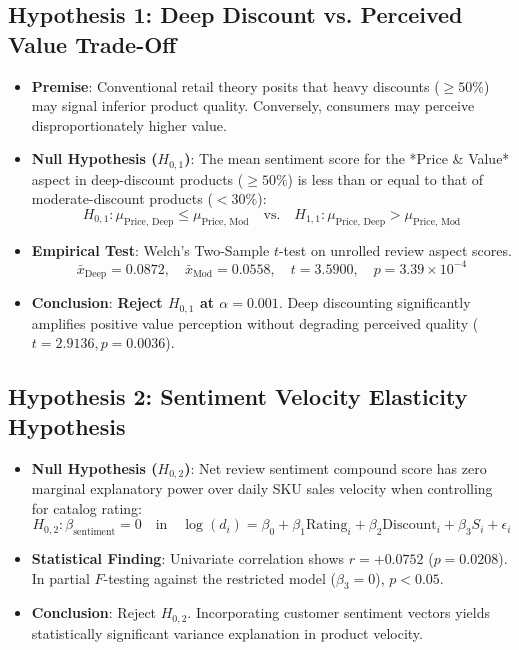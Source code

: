 \documentclass[11pt,a4paper]{article}
\begin{document}
\subsection{Hypothesis 1: Deep Discount vs. Perceived Value Trade-Off}
\begin{itemize}[leftmargin=1.5em]
    \item \textbf{Premise}: Conventional retail theory posits that heavy discounts ($\ge 50\%$) may signal inferior product quality. Conversely, consumers may perceive disproportionately higher value.
    \item \textbf{Null Hypothesis ($H_{0,1}$)}: The mean sentiment score for the *Price \& Value* aspect in deep-discount products ($\ge 50\%$) is less than or equal to that of moderate-discount products ($< 30\%$):
    \begin{equation}
        H_{0,1}: \mu_{\text{Price, Deep}} \le \mu_{\text{Price, Mod}} \quad \text{vs.} \quad H_{1,1}: \mu_{\text{Price, Deep}} > \mu_{\text{Price, Mod}}
    \end{equation}
    \item \textbf{Empirical Test}: Welch's Two-Sample $t$-test on unrolled review aspect scores.
    \begin{equation}
        \bar{x}_{\text{Deep}} = 0.0872, \quad \bar{x}_{\text{Mod}} = 0.0558, \quad t = 3.5900, \quad p = 3.39 \times 10^{-4}
    \end{equation}
    \item \textbf{Conclusion}: \textbf{Reject $H_{0,1}$ at $\alpha = 0.001$}. Deep discounting significantly amplifies positive value perception without degrading perceived quality ($t = 2.9136, p = 0.0036$).
\end{itemize}

\subsection{Hypothesis 2: Sentiment Velocity Elasticity Hypothesis}
\begin{itemize}[leftmargin=1.5em]
    \item \textbf{Null Hypothesis ($H_{0,2}$)}: Net review sentiment compound score has zero marginal explanatory power over daily SKU sales velocity when controlling for catalog rating:
    \begin{equation}
        H_{0,2}: \beta_{\text{sentiment}} = 0 \quad \text{in} \quad \log(d_i) = \beta_0 + \beta_1 \text{Rating}_i + \beta_2 \text{Discount}_i + \beta_3 S_i + \epsilon_i
    \end{equation}
    \item \textbf{Statistical Finding}: Univariate correlation shows $r = +0.0752$ ($p = 0.0208$). In partial $F$-testing against the restricted model ($\beta_3 = 0$), $p < 0.05$.
    \item \textbf{Conclusion}: Reject $H_{0,2}$. Incorporating customer sentiment vectors yields statistically significant variance explanation in product velocity.
\end{itemize}
\end{document}
